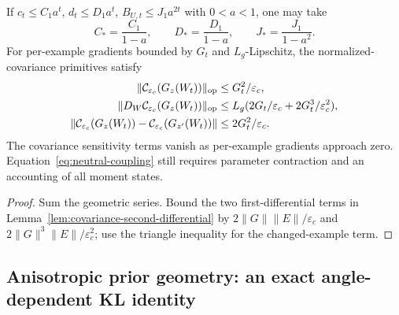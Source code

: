 \begin{corollary}
If $c_t\le C_1a^t$, $d_t\le D_1a^t$,
$B_{U,t}\le J_1a^{2t}$ with $0<a<1$, one may take
\begin{equation}
 C_*=\frac{C_1}{1-a},\qquad D_*=\frac{D_1}{1-a},\qquad
 J_*=\frac{J_1}{1-a^2}.
\end{equation}
For per-example gradients bounded by $G_t$ and $L_g$-Lipschitz, the
normalized-covariance primitives satisfy
\begin{align}
 \|\mathcal C_{\varepsilon_c}(G_z(W_t))\|_{\rm op}
 &\le G_t^2/\varepsilon_c,\\
 \|D_W\mathcal C_{\varepsilon_c}(G_z(W_t))\|_{\rm op}
 &\le L_g(2G_t/\varepsilon_c+2G_t^3/\varepsilon_c^2),\\
 \|\mathcal C_{\varepsilon_c}(G_z(W_t))
    -\mathcal C_{\varepsilon_c}(G_{z'}(W_t))\|
 &\le2G_t^2/\varepsilon_c.\label{eq:decaying-covariance-sensitivity}
\end{align}
The covariance sensitivity terms vanish as per-example gradients approach
zero. Equation~\eqref{eq:neutral-coupling} still requires parameter
contraction and an accounting of all moment states.
\end{corollary}
\begin{proof}
Sum the geometric series. Bound the two first-differential terms in
Lemma~\ref{lem:covariance-second-differential} by
$2\|G\|\|E\|/\varepsilon_c$ and
$2\|G\|^3\|E\|/\varepsilon_c^2$; use the triangle inequality for the
changed-example term.
\end{proof}

\subsection{Anisotropic prior geometry: an exact angle-dependent KL identity}
\label{app:angle-KL}

